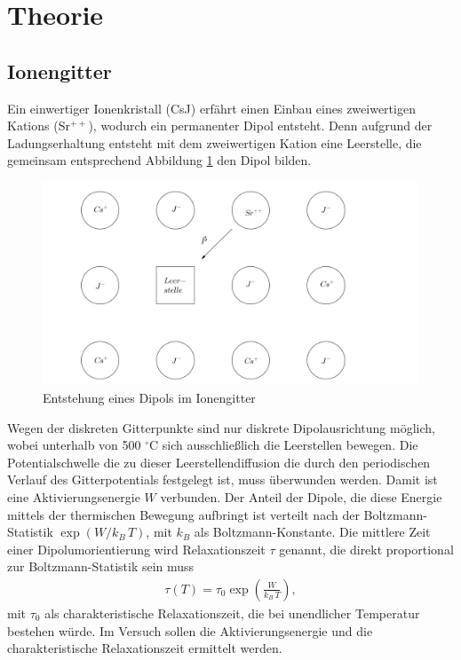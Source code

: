 

\section{Theorie}
\setcounter{page}{1}
\subsection{Ionengitter}
Ein einwertiger Ionenkristall (CsJ) erfährt einen Einbau eines zweiwertigen Kations (Sr$^{++}$), wodurch ein permanenter Dipol entsteht. Denn aufgrund
der Ladungserhaltung entsteht mit dem zweiwertigen Kation eine Leerstelle, die gemeinsam entsprechend Abbildung \ref{pic_dipGitt} den Dipol bilden.
\begin{figure}[H]
\includegraphics[width=\textwidth]{../pics/dipGitt.png}
\caption{Entstehung eines Dipols im Ionengitter}
\label{pic_dipGitt}
\end{figure}
Wegen der diskreten Gitterpunkte sind nur diskrete Dipolausrichtung möglich, wobei unterhalb von 500 $^\circ$C sich ausschließlich die Leerstellen bewegen.
Die Potentialschwelle die zu dieser Leerstellendiffusion die durch den periodischen Verlauf des Gitterpotentials festgelegt ist, muss überwunden werden.
Damit ist eine Aktivierungsenergie $W$ verbunden. Der Anteil der Dipole, die diese Energie mittels der thermischen Bewegung aufbringt ist
verteilt nach der Boltzmann-Statistik $\exp(W/k_B\,T)$, mit $k_B$ als Boltzmann-Konstante. Die mittlere Zeit einer Dipolumorientierung wird Relaxationszeit
$\tau$ genannt, die direkt proportional zur Boltzmann-Statistik sein muss
\begin{align}
 \tau(T) = \tau_0 \exp\left(\frac{W}{k_B\, T}\right),
 \label{eq_tau(W)}
\end{align}
mit $\tau_0$ als charakteristische Relaxationszeit, die bei unendlicher Temperatur bestehen würde. Im Versuch sollen die Aktivierungsenergie und die
charakteristische Relaxationszeit ermittelt werden.


